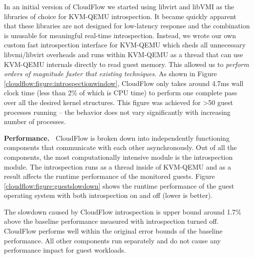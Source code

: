 In an initial version of CloudFlow we started using libvirt \cite{libvirt} 
and libVMI \cite{libvmi} as the libraries of choice for KVM-QEMU
introspection.  It became quickly apparent that these libraries are not
designed for low-latency response and the combination is unusable for
meaningful real-time introspection. 
%
%
Instead, we wrote our own custom fast introspection interface for KVM-QEMU
which sheds all unnecessary libvmi/libvirt overheads and runs within
KVM-QEMU as a thread that can use KVM-QEMU internals directly to read guest
memory.  This allowed us to {\em perform orders of magnitude faster that
existing techniques}.  As shown in Figure
\ref{cloudflow:figure:introspectionwindow}, CloudFlow only takes around
4.7ms wall clock time (less than 2\% of which is CPU time) to perform one
complete pass over all the desired kernel structures.  This figure was
achieved for >50 guest processes running -- the behavior does not vary
significantly with increasing number of processes.



\noindent
{\bf Performance.~}
%
CloudFlow is broken down into independently functioning components that
communicate with each other asynchronously.  Out of all the components, the
most computationally intensive module is the introspection module.  The
introspection runs as a thread inside of KVM-QEMU and as a result affects
the runtime performance of the monitored guests.  Figure
\ref{cloudflow:figure:guestslowdown} shows the runtime performance of the
guest operating system with both introspection on and off (lower is better). 

The slowdown caused by CloudFlow introspection is upper bound around 1.7\%
above the baseline performance measured with introspection turned off. 
CloudFlow performs well within the original error bounds of the baseline
performance. All
other components run separately and do not cause any performance impact for
guest workloads.


